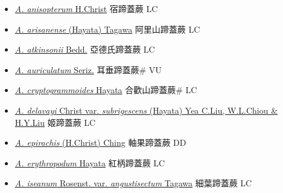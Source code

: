 \begin{itemize}
  \begin{itemize}
        \item[] \href{http://www.theplantlist.org/tpl1.1/search?q=Athyrium+anisopterum}{\textit{A. anisopterum} H.Christ}   宿蹄蓋蕨 LC
        \item[] \href{http://www.theplantlist.org/tpl1.1/search?q=Athyrium+arisanense}{\textit{A. arisanense} (Hayata) Tagawa}   阿里山蹄蓋蕨 LC
        \item[] \href{http://www.theplantlist.org/tpl1.1/search?q=Athyrium+atkinsonii}{\textit{A. atkinsonii} Bedd.}   亞德氏蹄蓋蕨 LC
        \item[] \href{http://www.theplantlist.org/tpl1.1/search?q=Athyrium+auriculatum}{\textit{A. auriculatum} Seriz.}   耳垂蹄蓋蕨\# VU
        \item[] \href{http://www.theplantlist.org/tpl1.1/search?q=Athyrium+cryptogrammoides}{\textit{A. cryptogrammoides} Hayata}   合歡山蹄蓋蕨\# LC
        \item[] \href{http://www.theplantlist.org/tpl1.1/search?q=Athyrium+delavayi+var.+subrigescens}{\textit{A. delavayi} Christ var. \textit{subrigescens} (Hayata) Yea C.Liu, W.L.Chiou \& H.Y.Liu}   姬蹄蓋蕨 LC
        \item[] \href{http://www.theplantlist.org/tpl1.1/search?q=Athyrium+epirachis}{\textit{A. epirachis} (H.Christ) Ching}   軸果蹄蓋蕨 DD
        \item[] \href{http://www.theplantlist.org/tpl1.1/search?q=Athyrium+erythropodum}{\textit{A. erythropodum} Hayata}   紅柄蹄蓋蕨 LC
        \item[] \href{http://www.theplantlist.org/tpl1.1/search?q=Athyrium+iseanum+var.+angustisectum}{\textit{A. iseanum} Rosenst. var. \textit{angustisectum} Tagawa}   細葉蹄蓋蕨 LC

\end{itemize}
\end{itemize}
